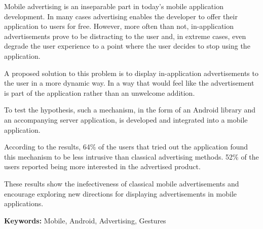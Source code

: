 \begin{abstracts}

Mobile advertising is an inseparable part in today's mobile application development. In many cases advertising enables the developer to offer their application to users for free. However, more often than not, in-application advertisements prove to be distracting to the user and, in extreme cases, even degrade the user experience to a point where the user decides to stop using the application.

A proposed solution to this problem is to display in-application advertisements to the user in a more dynamic way. In a way that would feel like the advertisement is part of the application rather than an unwelcome addition.

To test the hypothesis, such a mechanism, in the form of an Android library and an accompanying server application, is developed and integrated into a mobile application.

According to the results, 64\% of the users that tried out the application found this mechanism to be less intrusive than classical advertising methods. 52\% of the users reported being more interested in the advertised product.

These results show the inefectiveness of classical mobile advertisements and encourage exploring new directions for displaying advertisements in mobile applications.

\bigskip

\textbf{Keywords:} Mobile, Android, Advertising, Gestures

\end{abstracts}